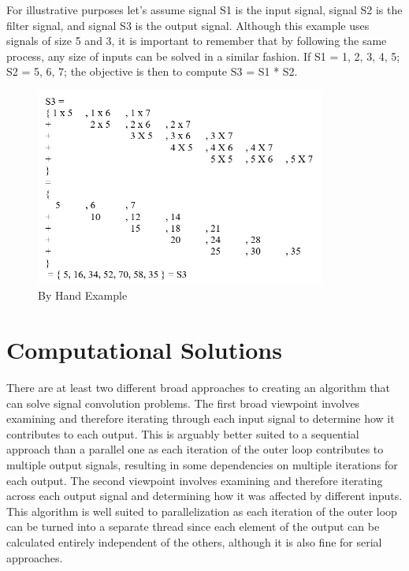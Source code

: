\documentclass{article}
\begin{document}
For illustrative purposes let’s assume signal S1 is the input signal, signal S2 is the filter signal, and signal S3 is the output signal. Although this example uses signals of size 5 and 3, it is important to remember that by following the same process, any size of inputs can be solved in a similar fashion. If S1 = {1, 2, 3, 4, 5}; S2 = {5, 6, 7}; the objective is then to compute S3 = S1 * S2.

\begin{figure}[htp]
    \centering
    \includegraphics[width=0.85\textwidth]{1048_1.png}
    \caption{By Hand Example}
    \label{fig:hand}
\end{figure}

\section{Computational Solutions}
There are at least two different broad approaches to creating an algorithm that can solve signal convolution problems. The first broad viewpoint involves examining and therefore iterating through each input signal to determine how it contributes to each output. This is arguably better suited to a sequential approach than a parallel one as each iteration of the outer loop contributes to multiple output signals, resulting in some dependencies on multiple iterations for each output. The second viewpoint involves examining and therefore iterating across each output signal and determining how it was affected by different inputs. This algorithm is well suited to parallelization as each iteration of the outer loop can be turned into a separate thread since each element of the output can be calculated entirely independent of the others, although it is also fine for serial approaches.
\end{document}
